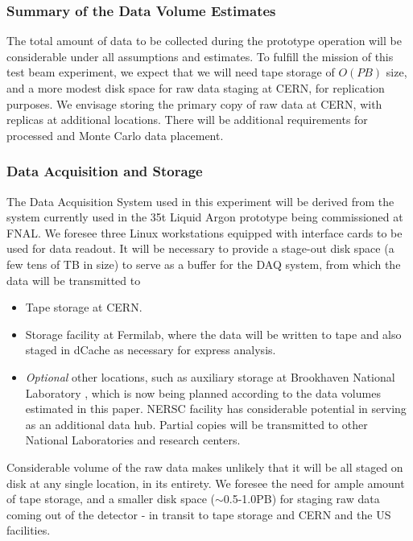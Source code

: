 \subsubsection{Summary of the Data Volume Estimates}
The total amount of data to be collected during the prototype operation will be considerable under all assumptions and estimates.
To fulfill the mission of this test beam experiment, we expect that we will need tape storage of $O(PB)$ size,
and a more modest disk space for raw data staging at CERN, for replication purposes. We envisage storing the primary copy of raw data
at CERN, with replicas at additional locations. There will be additional requirements for processed and Monte Carlo data placement.

\subsubsection{Data Acquisition and Storage}
\label{daq_and_storage}
The Data Acquisition System used in this experiment will be derived from the system currently used in the 35t Liquid Argon prototype being commissioned at FNAL. We foresee three Linux workstations equipped with interface cards to be used for data readout. It will be necessary to provide a stage-out disk space (a few tens of TB in size) to serve as a buffer for the DAQ system, from which the data will be transmitted to
\begin{itemize}
\item Tape storage at CERN.
\item Storage facility at Fermilab, where the data will be written to tape and also staged in dCache as necessary for express analysis.
\item \textit{Optional} other locations, such as auxiliary storage at Brookhaven National Laboratory , which is now being planned according to the data volumes
estimated in this paper. NERSC facility has considerable potential in serving as an additional data hub. Partial copies will be transmitted to other National Laboratories
and research centers.
\end{itemize}

Considerable volume of the raw data makes unlikely that it will be all staged on disk at any single location, in its entirety. We foresee the
 need for ample amount of tape storage, and a smaller disk space ($\sim$0.5-1.0PB) for staging raw data coming out of the detector - in transit to tape
storage and CERN and the US facilities.

